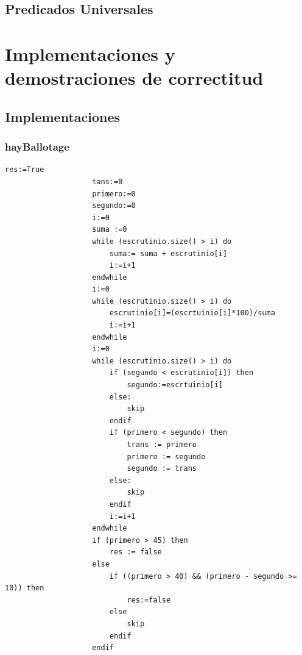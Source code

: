 \documentclass[10pt,a4paper]{article}
\begin{document}
	\subsection{Predicados Universales}
		
		
	
		
		
		


\section{Implementaciones y demostraciones de correctitud}

	\subsection{Implementaciones}
		
		\subsubsection{hayBallotage}
			\begin{minipage}[t]{\textwidth}
				\begin{lstlisting}[caption={()},label=code:for]
					res:=True
					tans:=0
					primero:=0
					segundo:=0
					i:=0
					suma :=0
					while (escrutinio.size() > i) do
						suma:= suma + escrutinio[i]
						i:=i+1
					endwhile
					i:=0
					while (escrutinio.size() > i) do
						escrutinio[i]=(escrtuinio[i]*100)/suma
						i:=i+1
					endwhile
					i:=0
					while (escrutinio.size() > i) do 
						if (segundo < escrutinio[i]) then
							segundo:=escrtuinio[i]
						else:
							skip
						endif
						if (primero < segundo) then
							trans := primero
							primero := segundo
							segundo := trans
						else:
							skip
						endif
						i:=i+1
					endwhile
					if (primero > 45) then
						res := false
					else
						if ((primero > 40) && (primero - segundo >= 10)) then
							res:=false
						else
							skip
						endif
					endif

				\end{lstlisting}
			\end{minipage}
\end{document}
